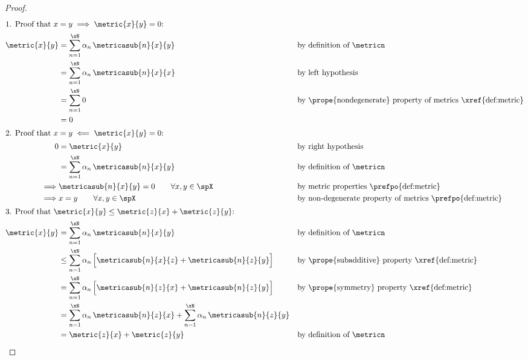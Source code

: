 \begin{proof}
\begin{align*}
  \intertext{1. Proof that $x=y\implies\metric{x}{y}=0$:}
  \metric{x}{y}
    &= \sum_{n=1}^\xN \alpha_n\, \metricasub{n}{x}{y}
    && \text{by definition of $\metricn$}
  \\&= \sum_{n=1}^\xN \alpha_n\, \metricasub{n}{x}{x}
    && \text{by left hypothesis}
  \\&= \sum_{n=1}^\xN 0
    && \text{by \prope{nondegenerate} property of metrics \xref{def:metric}}
  \\&= 0
  \\
  \intertext{2. Proof that $x=y\impliedby\metric{x}{y}=0$:}
  0
    &= \metric{x}{y}
    && \text{by right hypothesis}
  \\&= \sum_{n=1}^\xN \alpha_n\, \metricasub{n}{x}{y}
    && \text{by definition of $\metricn$}
  \\\implies & \metricasub{n}{x}{y}=0 \qquad \forall x,y\in\spX
    && \text{by metric properties \prefpo{def:metric}}
  \\\implies & x=y \qquad \forall x,y\in\spX
    && \text{by non-degenerate property of metrics \prefpo{def:metric}}
  \\
  \intertext{3. Proof that $\metric{x}{y}\le\metric{z}{x}+\metric{z}{y}$:}
  \metric{x}{y}
    &= \sum_{n=1}^\xN \alpha_n\, \metricasub{n}{x}{y}
    && \text{by definition of $\metricn$}
  \\&\le \sum_{n=1}^\xN \alpha_n\,\Big[ \metricasub{n}{x}{z} + \metricasub{n}{z}{y} \Big]
    && \text{by \prope{subadditive} property \xref{def:metric}}
  \\&= \sum_{n=1}^\xN \alpha_n\,\Big[ \metricasub{n}{z}{x} + \metricasub{n}{z}{y} \Big]
    && \text{by \prope{symmetry} property \xref{def:metric}}
  \\&= \sum_{n=1}^\xN \alpha_n\,\metricasub{n}{z}{x} +  \sum_{n=1}^\xN \alpha_n\, \metricasub{n}{z}{y} 
  \\&= \metric{z}{x} + \metric{z}{y}
    && \text{by definition of $\metricn$}
\end{align*}
\end{proof}



